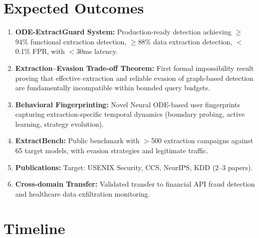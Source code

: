 \documentclass[12pt,a4paper]{article}
\begin{document}
\section{Expected Outcomes}

\begin{enumerate}
    \item \textbf{ODE-ExtractGuard System:} Production-ready detection achieving $\geq$94\% functional extraction detection, $\geq$88\% data extraction detection, $<$0.1\% FPR, with $<$30ms latency.
    
    \item \textbf{Extraction--Evasion Trade-off Theorem:} First formal impossibility result proving that effective extraction and reliable evasion of graph-based detection are fundamentally incompatible within bounded query budgets.
    
    \item \textbf{Behavioral Fingerprinting:} Novel Neural ODE-based user fingerprints capturing extraction-specific temporal dynamics (boundary probing, active learning, strategy evolution).
    
    \item \textbf{ExtractBench:} Public benchmark with $>$500 extraction campaigns against 65 target models, with evasion strategies and legitimate traffic.
    
    \item \textbf{Publications:} Target: USENIX Security, CCS, NeurIPS, KDD (2--3 papers).
    
    \item \textbf{Cross-domain Transfer:} Validated transfer to financial API fraud detection and healthcare data exfiltration monitoring.
\end{enumerate}

\section{Timeline}
\end{document}
